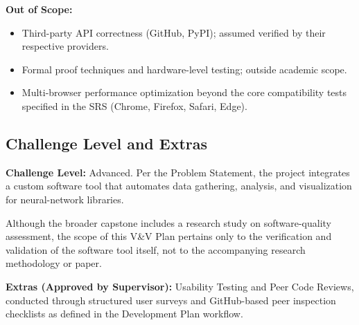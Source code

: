 \documentclass[12pt, titlepage]{article}
\begin{document}
\textbf{Out of Scope:}
\begin{itemize}
  \item Third-party API correctness (GitHub, PyPI); assumed verified by their
  respective providers.

  \item Formal proof techniques and hardware-level testing; outside academic
  scope.

  \item Multi-browser performance optimization beyond the core compatibility
  tests specified in the SRS (Chrome, Firefox, Safari, Edge).
\end{itemize}

\subsection{Challenge Level and Extras}
\label{subsec:challenge-level}

\textbf{Challenge Level:} Advanced. Per the Problem Statement, the project
integrates a custom software tool that automates data gathering, analysis, and
visualization for neural-network libraries.

Although the broader capstone includes a research study on software-quality
assessment, the scope of this V\&V Plan pertains only to the verification and
validation of the software tool itself, not to the accompanying research
methodology or paper.


\textbf{Extras (Approved by Supervisor):} Usability Testing and Peer Code
Reviews, conducted through structured user surveys and GitHub-based peer
inspection checklists as defined in the Development Plan workflow.
\end{document}
